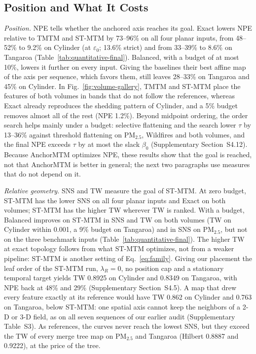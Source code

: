 \subsection{Position and What It Costs}\label{sec:reference-results}
\emph{Position.} NPE tells whether the anchored axis reaches its goal. Exact lowers NPE relative to TMTM and ST-MTM by 73--96\% on all four planar inputs, from 48--52\% to 9.2\% on Cylinder (at $\varepsilon_0$; 13.6\% strict) and from 33--39\% to 8.6\% on Tangaroa (Table~\ref{tab:quantitative-final}). Balanced, with a budget of at most 10\%, lowers it further on every input. Giving the baselines their best affine map of the axis per sequence, which favors them, still leaves 28--33\% on Tangaroa and 45\% on Cylinder. In Fig.~\ref{fig:volume-gallery}, TMTM and ST-MTM place the features of both volumes in bands that do not follow the references, whereas Exact already reproduces the shedding pattern of Cylinder, and a 5\% budget removes almost all of the rest (NPE 1.2\%). Beyond midpoint ordering, the order search helps mainly under a budget: selective flattening and the search lower $\tau$ by 13--36\% against threshold flattening on PM$_{2.5}$, Wildfires and both volumes, and the final NPE exceeds $\tau$ by at most the slack $\beta_0$ (Supplementary Section~S4.12). Because AnchorMTM optimizes NPE, these results show that the goal is reached, not that AnchorMTM is better in general; the next two paragraphs use measures that do not depend on it.

\emph{Relative geometry.} SNS and TW measure the goal of ST-MTM. At zero budget, ST-MTM has the lower SNS on all four planar inputs and Exact on both volumes; ST-MTM has the higher TW wherever TW is ranked. With a budget, Balanced improves on ST-MTM in SNS and TW on both volumes (TW on Cylinder within 0.001, a 9\% budget on Tangaroa) and in SNS on PM$_{2.5}$, but not on the three benchmark inputs (Table~\ref{tab:quantitative-final}). The higher TW at exact topology follows from what ST-MTM optimizes, not from a weaker pipeline: ST-MTM is another setting of Eq.~\ref{eq:family}. Giving our placement the leaf order of the ST-MTM run, $\lambda_R=0$, no position cap and a stationary temporal target yields TW 0.8925 on Cylinder and 0.8349 on Tangaroa, with NPE back at 48\% and 29\% (Supplementary Section~S4.5). A map that drew every feature exactly at its reference would have TW 0.862 on Cylinder and 0.763 on Tangaroa, below ST-MTM: one spatial axis cannot keep the neighbors of a 2-D or 3-D field, as on all seven sequences of our earlier audit (Supplementary Table~S3). As references, the curves never reach the lowest SNS, but they exceed the TW of every merge tree map on PM$_{2.5}$ and Tangaroa (Hilbert 0.8887 and 0.9222), at the price of the tree.

